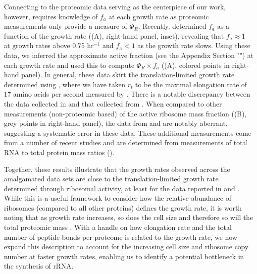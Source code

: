 Connecting  to the proteomic data serving as the centerpiece of
our work, however, requires knowledge
of $f_a$ at each growth rate as proteomic measurements only provide a
measure of $\Phi_R$. Recently, \cite{dai2016} determined $f_a$ as a function of
the growth rate ((A), right-hand panel, inset), revealing
that $f_a \approx 1$ at growth rates above 0.75 hr$^{-1}$ and $f_a < 1$ as the
growth rate slows. Using these data, we inferred the approximate active fraction
(see the Appendix Section "") at each growth rate and used this to compute
$\Phi_R \times f_a$ ((A), colored points in right-hand
panel). In general, these data skirt the translation-limited growth rate
determined using , where we have taken $r_t$ to be the maximal elongation
rate of 17 amino acids per second measured by \cite{dai2016}. There is a notable
discrepancy between the data collected in \cite{schmidt2016, li2014} and that
collected from \cite{valgepea2013, peebo2015}. When compared to other
measurements (non-proteomic based) of the active ribosome mass fraction
((B), grey points in right-hand panel), the data from
\cite{valgepea2013} and \cite{peebo2015} are notably aberrant, suggesting a
systematic error in these data. These additional measurements come from a number
of recent studies and are determined from measurements of total RNA to total
protein mass ratios ().

Together, these results illustrate that the growth rates observed across the
amalgamated data sets are close to the translation-limited growth rate
determined through  ribosomal activity, at least for the data reported in
\cite{schmidt2016} and \cite{li2014}. While this is a useful framework to
consider how the relative abundance of ribosomes (compared to all other
proteins) defines the growth rate, it is worth noting that as growth rate
increases, so does the cell size and therefore so will the total proteomic mass
\citep{basan2015}. With a handle on how elongation rate and the total number of
peptide bonds per proteome is related to the growth rate, we now expand this
description to account for the increasing cell size and ribosome copy number at
faster growth rates,  enabling us to identify a potential bottleneck in the
synthesis of rRNA.

